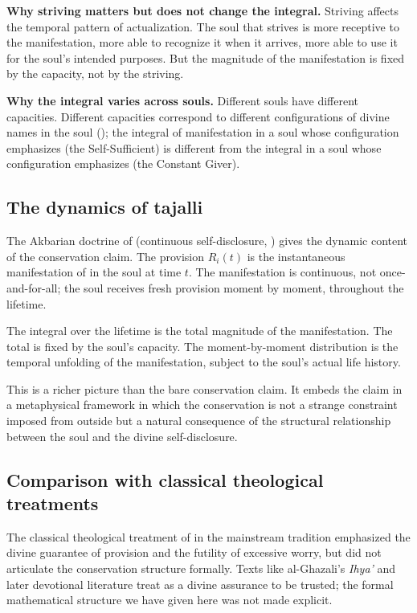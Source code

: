 \textbf{Why striving matters but does not change the integral.}
Striving affects the temporal pattern of actualization. The soul
that strives is more receptive to the manifestation, more able to
recognize it when it arrives, more able to use it for the soul's
intended purposes. But the magnitude of the manifestation is fixed
by the capacity, not by the striving.

\textbf{Why the integral varies across souls.} Different souls have
different capacities. Different capacities correspond to different
configurations of divine names in the soul ();
the integral of  manifestation in a soul whose
configuration emphasizes  (the Self-Sufficient) is
different from the integral in a soul whose configuration
emphasizes  (the Constant Giver).

\subsection{The dynamics of tajalli}

The Akbarian doctrine of  (continuous self-disclosure,
) gives the dynamic content of the
conservation claim. The provision $R_i(t)$ is the instantaneous
manifestation of  in the soul at time $t$. The
manifestation is continuous, not once-and-for-all; the soul receives
fresh provision moment by moment, throughout the lifetime.

The integral over the lifetime is the total magnitude of the
manifestation. The total is fixed by the soul's capacity. The
moment-by-moment distribution is the temporal unfolding of the
manifestation, subject to the soul's actual life history.

This is a richer picture than the bare conservation claim. It
embeds the claim in a metaphysical framework in which the
conservation is not a strange constraint imposed from outside but
a natural consequence of the structural relationship between the
soul and the divine self-disclosure.

\subsection{Comparison with classical theological treatments}

The classical theological treatment of  in the
mainstream tradition emphasized the divine guarantee of provision
and the futility of excessive worry, but did not articulate the
conservation structure formally. Texts like al-Ghazali's
\textit{Ihya'} and later devotional literature treat  as
a divine assurance to be trusted; the formal mathematical structure
we have given here was not made explicit.

